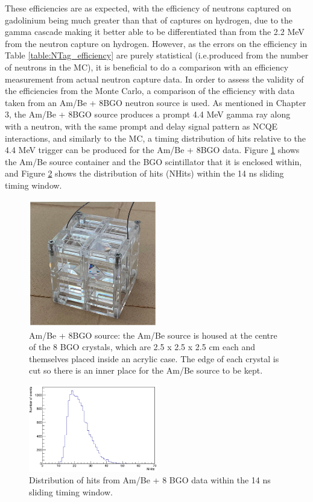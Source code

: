 These efficiencies are as expected, with the efficiency of neutrons captured on gadolinium being much greater than that of captures on hydrogen, due to the gamma cascade making it better able to be differentiated than from the 2.2 MeV from the neutron capture on hydrogen. However, as the errors on the efficiency in Table \ref{table:NTag_efficiency} are purely statistical (i.e.produced from the number of neutrons in the MC), it is beneficial to do a comparison with an efficiency measurement from actual neutron capture data. In order to assess the validity of the efficiencies from the Monte Carlo, a comparison of the efficiency with data taken from an Am/Be + 8BGO neutron source is used. As mentioned in Chapter 3, the Am/Be + 8BGO source produces a prompt 4.4 MeV gamma ray along with a neutron, with the same prompt and delay signal pattern as NCQE interactions, and similarly to the MC, a timing distribution of hits relative to the 4.4 MeV trigger can be produced for the Am/Be + 8BGO data. Figure \ref{fig:ambe_picture} shows the Am/Be source container and the BGO scintillator that it is enclosed within, and Figure \ref{fig:ambe_NHits} shows the distribution of hits (NHits) within the 14 ns sliding timing window. 



\begin{figure}
    \centering
    \includegraphics[width=0.5\textwidth]{Figures/ambe_picture.PNG}
    \caption{Am/Be + 8BGO source: the Am/Be source is housed at the centre of the 8 BGO crystals, which are 2.5 x 2.5 x 2.5 cm each and themselves placed inside an acrylic case. The edge of each crystal is cut so there is an inner place for the Am/Be source to be kept.}
    \label{fig:ambe_picture}
\end{figure}


\begin{figure}
    \centering
    \includegraphics[width=0.5\textwidth]{Figures/NHits_ambe_distribution.PNG}
    \caption{Distribution of hits from Am/Be + 8 BGO data within the 14 ns sliding timing window.}
    \label{fig:ambe_NHits}
\end{figure}




